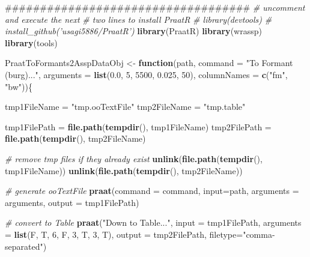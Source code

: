 \documentclass[]{book}
\newenvironment{Shaded}{\begin{snugshade}}{\end{snugshade}}
\newcommand{\CommentTok}[1]{\textcolor[rgb]{0.56,0.35,0.01}{\textit{#1}}}
\newcommand{\ControlFlowTok}[1]{\textcolor[rgb]{0.13,0.29,0.53}{\textbf{#1}}}
\newcommand{\DataTypeTok}[1]{\textcolor[rgb]{0.13,0.29,0.53}{#1}}
\newcommand{\DecValTok}[1]{\textcolor[rgb]{0.00,0.00,0.81}{#1}}
\newcommand{\FloatTok}[1]{\textcolor[rgb]{0.00,0.00,0.81}{#1}}
\newcommand{\KeywordTok}[1]{\textcolor[rgb]{0.13,0.29,0.53}{\textbf{#1}}}
\newcommand{\NormalTok}[1]{#1}
\newcommand{\StringTok}[1]{\textcolor[rgb]{0.31,0.60,0.02}{#1}}
\theoremstyle{definition}
\theoremstyle{definition}
\theoremstyle{definition}
\theoremstyle{remark}
\begin{document}
\begin{Shaded}
\begin{Highlighting}[]
\NormalTok{###################################}
\CommentTok{# uncomment and execute the next }
\CommentTok{# two lines to install PraatR}
\CommentTok{# library(devtools)}
\CommentTok{# install_github('usagi5886/PraatR')}
\KeywordTok{library}\NormalTok{(PraatR)}
\KeywordTok{library}\NormalTok{(wrassp)}
\KeywordTok{library}\NormalTok{(tools)}

\NormalTok{PraatToFormants2AsspDataObj <-}\StringTok{ }\ControlFlowTok{function}\NormalTok{(path,}
                                        \DataTypeTok{command =} 
                                          \StringTok{"To Formant (burg)..."}\NormalTok{,}
                                        \DataTypeTok{arguments =} \KeywordTok{list}\NormalTok{(}\FloatTok{0.0}\NormalTok{, }
                                                         \DecValTok{5}\NormalTok{, }\DecValTok{5500}\NormalTok{, }
                                                         \FloatTok{0.025}\NormalTok{, }\DecValTok{50}\NormalTok{), }
                                        \DataTypeTok{columnNames =} \KeywordTok{c}\NormalTok{(}\StringTok{"fm"}\NormalTok{, }\StringTok{"bw"}\NormalTok{))\{}

\NormalTok{  tmp1FileName =}\StringTok{ "tmp.ooTextFile"}
\NormalTok{  tmp2FileName =}\StringTok{ "tmp.table"}
  
\NormalTok{  tmp1FilePath =}\StringTok{ }\KeywordTok{file.path}\NormalTok{(}\KeywordTok{tempdir}\NormalTok{(), tmp1FileName)}
\NormalTok{  tmp2FilePath =}\StringTok{ }\KeywordTok{file.path}\NormalTok{(}\KeywordTok{tempdir}\NormalTok{(), tmp2FileName)}
  
  \CommentTok{# remove tmp files if they already exist}
  \KeywordTok{unlink}\NormalTok{(}\KeywordTok{file.path}\NormalTok{(}\KeywordTok{tempdir}\NormalTok{(), tmp1FileName))}
  \KeywordTok{unlink}\NormalTok{(}\KeywordTok{file.path}\NormalTok{(}\KeywordTok{tempdir}\NormalTok{(), tmp2FileName))}
  
  \CommentTok{# generate ooTextFile}
  \KeywordTok{praat}\NormalTok{(}\DataTypeTok{command =}\NormalTok{ command, }
        \DataTypeTok{input=}\NormalTok{path, }
        \DataTypeTok{arguments =}\NormalTok{ arguments, }
        \DataTypeTok{output =}\NormalTok{ tmp1FilePath)}
  
  \CommentTok{# convert to Table}
  \KeywordTok{praat}\NormalTok{(}\StringTok{"Down to Table..."}\NormalTok{,}
        \DataTypeTok{input =}\NormalTok{ tmp1FilePath,}
        \DataTypeTok{arguments =} \KeywordTok{list}\NormalTok{(F, T, }\DecValTok{6}\NormalTok{, F, }\DecValTok{3}\NormalTok{, T, }\DecValTok{3}\NormalTok{, T), }
        \DataTypeTok{output =}\NormalTok{ tmp2FilePath,}
        \DataTypeTok{filetype=}\StringTok{"comma-separated"}\NormalTok{)}
  

\end{Highlighting}
\end{Shaded}
\end{document}
